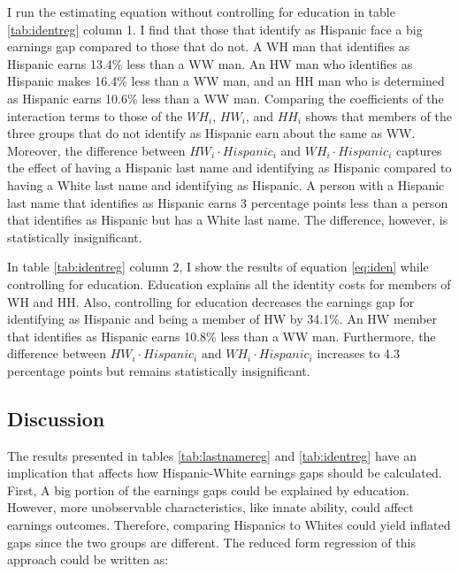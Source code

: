 \documentclass[12pt, fullpage]{article}
\begin{document}
I run the estimating equation without controlling for education in table \ref{tab:identreg} column 1. I find that those that identify as Hispanic face a big earnings gap compared to those that do not. A WH man that identifies as Hispanic earns 13.4\% less than a WW man. An HW man who identifies as Hispanic makes 16.4\% less than a WW man, and an HH man who is determined as Hispanic earns 10.6\% less than a WW man. Comparing the coefficients of the interaction terms to those of the $WH_{i}$, $HW_{i}$, and $HH_{i}$ shows that members of the three groups that do not identify as Hispanic earn about the same as WW.
Moreover, the difference between $HW_{i} \cdot Hispanic_{i}$  and $WH_{i} \cdot Hispanic_{i}$ captures the effect of having a Hispanic last name and identifying as Hispanic compared to having a White last name and identifying as Hispanic. A person with a Hispanic last name that identifies as Hispanic earns 3 percentage points less than a person that identifies as Hispanic but has a White last name. The difference, however, is statistically insignificant.

In table  \ref{tab:identreg} column 2, I show the results of equation \ref{eq:iden} while controlling for education. Education explains all the identity costs for members of WH and HH. Also, controlling for education decreases the earnings gap for identifying as Hispanic and being a member of HW by 34.1\%. An HW member that identifies as Hispanic earns 10.8\% less than a WW man. Furthermore, the difference between $HW_{i} \cdot Hispanic_{i}$  and $WH_{i} \cdot Hispanic_{i}$ increases to 4.3 percentage points but remains statistically insignificant.








\subsection{Discussion}
 
 The results presented in tables \ref{tab:lastnamereg} and \ref{tab:identreg} have an implication that affects how Hispanic-White earnings gaps should be calculated. First, A big portion of the earnings gaps could be explained by education. However, more unobservable characteristics, like innate ability, could affect earnings outcomes. Therefore, comparing Hispanics to Whites could yield inflated gaps since the two groups are different. The reduced form regression of this approach could be written as:
 
\end{document}
